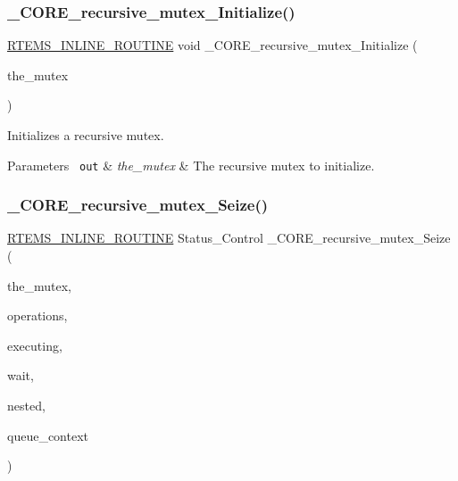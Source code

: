 \subsubsection{\texorpdfstring{\_CORE\_recursive\_mutex\_Initialize()}{\_CORE\_recursive\_mutex\_Initialize()}}
{\footnotesize\ttfamily \mbox{\hyperlink{group__RTEMSScoreBaseDefs_gac216239df231d5dbd15e3520b0b9313f}{R\+T\+E\+M\+S\+\_\+\+I\+N\+L\+I\+N\+E\+\_\+\+R\+O\+U\+T\+I\+NE}} void \+\_\+\+C\+O\+R\+E\+\_\+recursive\+\_\+mutex\+\_\+\+Initialize (\begin{DoxyParamCaption}\item[{\mbox{\hyperlink{structCORE__recursive__mutex__Control}{C\+O\+R\+E\+\_\+recursive\+\_\+mutex\+\_\+\+Control}} $\ast$}]{the\+\_\+mutex }\end{DoxyParamCaption})}



Initializes a recursive mutex. 


\begin{DoxyParams}[1]{Parameters}
\mbox{\texttt{ out}}  & {\em the\+\_\+mutex} & The recursive mutex to initialize. \\
\hline
\end{DoxyParams}
\mbox{\label{group__RTEMSScoreMutex_gaacb95bc0bdba9fb365d01dfe2623665d}} 
\subsubsection{\texorpdfstring{\_CORE\_recursive\_mutex\_Seize()}{\_CORE\_recursive\_mutex\_Seize()}}
{\footnotesize\ttfamily \mbox{\hyperlink{group__RTEMSScoreBaseDefs_gac216239df231d5dbd15e3520b0b9313f}{R\+T\+E\+M\+S\+\_\+\+I\+N\+L\+I\+N\+E\+\_\+\+R\+O\+U\+T\+I\+NE}} Status\+\_\+\+Control \+\_\+\+C\+O\+R\+E\+\_\+recursive\+\_\+mutex\+\_\+\+Seize (\begin{DoxyParamCaption}\item[{\mbox{\hyperlink{structCORE__recursive__mutex__Control}{C\+O\+R\+E\+\_\+recursive\+\_\+mutex\+\_\+\+Control}} $\ast$}]{the\+\_\+mutex,  }\item[{const \mbox{\hyperlink{structThread__queue__Operations}{Thread\+\_\+queue\+\_\+\+Operations}} $\ast$}]{operations,  }\item[{\mbox{\hyperlink{struct__Thread__Control}{Thread\+\_\+\+Control}} $\ast$}]{executing,  }\item[{bool}]{wait,  }\item[{Status\+\_\+\+Control($\ast$)(\mbox{\hyperlink{structCORE__recursive__mutex__Control}{C\+O\+R\+E\+\_\+recursive\+\_\+mutex\+\_\+\+Control}} $\ast$)}]{nested,  }\item[{\mbox{\hyperlink{structThread__queue__Context}{Thread\+\_\+queue\+\_\+\+Context}} $\ast$}]{queue\+\_\+context }\end{DoxyParamCaption})}



